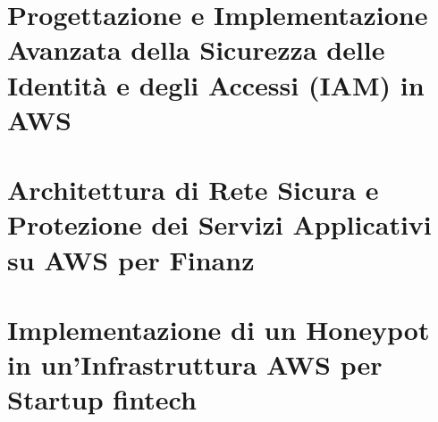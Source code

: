 \documentclass[a4paper,12pt]{report}
\begin{document}
\chapter{Progettazione e Implementazione Avanzata della Sicurezza delle Identità e degli Accessi (IAM) in AWS}
\label{ch:iam_security}

\chapter{Architettura di Rete Sicura e Protezione dei Servizi Applicativi su AWS per Finanz}
\label{ch:vpc_infra_security}


\chapter{Implementazione di un Honeypot in un'Infrastruttura AWS per Startup fintech}
\label{chap:honeypot_aws}


% 
\end{document}
